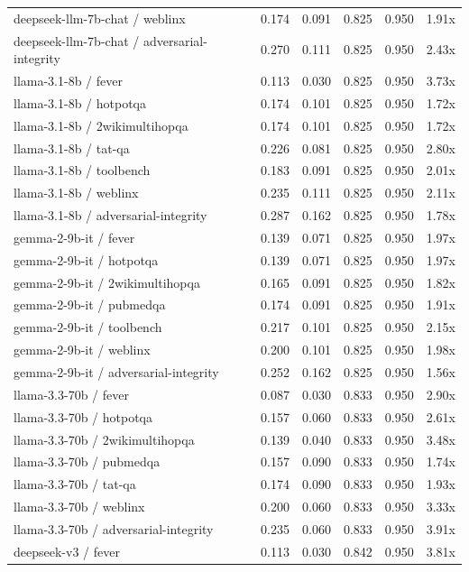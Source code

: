 \begin{table}[h]
\begin{tabular}{l|cc|cc|c}
deepseek-llm-7b-chat / weblinx & 0.174 & 0.091 & 0.825 & 0.950 & 1.91x \\
deepseek-llm-7b-chat / adversarial-integrity & 0.270 & 0.111 & 0.825 & 0.950 & 2.43x \\
llama-3.1-8b / fever & 0.113 & 0.030 & 0.825 & 0.950 & 3.73x \\
llama-3.1-8b / hotpotqa & 0.174 & 0.101 & 0.825 & 0.950 & 1.72x \\
llama-3.1-8b / 2wikimultihopqa & 0.174 & 0.101 & 0.825 & 0.950 & 1.72x \\
llama-3.1-8b / tat-qa & 0.226 & 0.081 & 0.825 & 0.950 & 2.80x \\
llama-3.1-8b / toolbench & 0.183 & 0.091 & 0.825 & 0.950 & 2.01x \\
llama-3.1-8b / weblinx & 0.235 & 0.111 & 0.825 & 0.950 & 2.11x \\
llama-3.1-8b / adversarial-integrity & 0.287 & 0.162 & 0.825 & 0.950 & 1.78x \\
gemma-2-9b-it / fever & 0.139 & 0.071 & 0.825 & 0.950 & 1.97x \\
gemma-2-9b-it / hotpotqa & 0.139 & 0.071 & 0.825 & 0.950 & 1.97x \\
gemma-2-9b-it / 2wikimultihopqa & 0.165 & 0.091 & 0.825 & 0.950 & 1.82x \\
gemma-2-9b-it / pubmedqa & 0.174 & 0.091 & 0.825 & 0.950 & 1.91x \\
gemma-2-9b-it / toolbench & 0.217 & 0.101 & 0.825 & 0.950 & 2.15x \\
gemma-2-9b-it / weblinx & 0.200 & 0.101 & 0.825 & 0.950 & 1.98x \\
gemma-2-9b-it / adversarial-integrity & 0.252 & 0.162 & 0.825 & 0.950 & 1.56x \\
llama-3.3-70b / fever & 0.087 & 0.030 & 0.833 & 0.950 & 2.90x \\
llama-3.3-70b / hotpotqa & 0.157 & 0.060 & 0.833 & 0.950 & 2.61x \\
llama-3.3-70b / 2wikimultihopqa & 0.139 & 0.040 & 0.833 & 0.950 & 3.48x \\
llama-3.3-70b / pubmedqa & 0.157 & 0.090 & 0.833 & 0.950 & 1.74x \\
llama-3.3-70b / tat-qa & 0.174 & 0.090 & 0.833 & 0.950 & 1.93x \\
llama-3.3-70b / weblinx & 0.200 & 0.060 & 0.833 & 0.950 & 3.33x \\
llama-3.3-70b / adversarial-integrity & 0.235 & 0.060 & 0.833 & 0.950 & 3.91x \\
deepseek-v3 / fever & 0.113 & 0.030 & 0.842 & 0.950 & 3.81x \\

\end{tabular}
\end{table}

